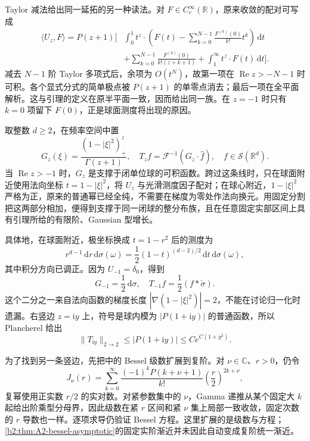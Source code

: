 Taylor 减法给出同一延拓的另一种读法。对 \(F\in C_c^\infty(\mathbb R)\)，原来收敛的配对可写成
\[
 \begin{aligned}
 \langle U_z,F\rangle
 =P(z+1)\biggl[
 &\int_0^1 t^z\cdot
 \left(F(t)-\sum_{k=0}^{N-1}\frac{F^{(k)}(0)}{k!}t^k\right)\,\mathrm dt\\
 &+\sum_{k=0}^{N-1}\frac{F^{(k)}(0)}{k!(z+k+1)}
 +\int_1^\infty t^z\cdot F(t)\,\mathrm dt
 \biggr].
 \end{aligned}
\]
减去 \(N-1\) 阶 Taylor 多项式后，余项为 \(O(t^N)\)，故第一项在 \(\operatorname{Re}z>-N-1\) 时可积。各个显式分式的简单极点被 \(P(z+1)\) 的单零点消去；最后一项在全平面解析。这与引理的定义在原半平面一致，因而给出同一族。在 \(z=-1\) 时只有 \(k=0\) 项留下 \(F(0)\)，正是球面测度将出现的原因。

\ProseParagraphBreak
取整数 \(d\geq2\)，在频率空间中置
\[
 G_z(\xi)=\frac{(1-|\xi|^2)_+^z}{\Gamma(z+1)},
 \quad T_zf=\mathcal F^{-1}(G_z\cdot\widehat f),
 \quad f\in\mathcal S(\mathbb R^d).
\]
当 \(\operatorname{Re}z>-1\) 时，\(G_z\) 是支撑于闭单位球的可积函数。跨过这条线时，只在球面附近使用法向坐标 \(t=1-|\xi|^2\)，将 \(U_z\) 与光滑测度因子配对；在球心附近，\(1-|\xi|^2\) 严格为正，原来的普通幂已经全纯，不需要在梯度为零处作法向换元。用固定分割把这两部分相加，便得到支撑于同一闭球的整分布族，且在任意固定实部区间上具有引理所给的有限阶、Gaussian 型增长。

\ProseParagraphBreak
具体地，在球面附近，极坐标换成 \(t=1-r^2\) 后的测度为
\[
 r^{d-1}\,\mathrm dr\,\mathrm d\sigma(\omega)
 =\frac12(1-t)^{(d-2)/2}\,\mathrm dt\,\mathrm d\sigma(\omega),
\]
其中积分方向已调正。因为 \(U_{-1}=\delta_0\)，得到
\[
 G_{-1}=\frac12\,\mathrm d\sigma,\quad
 T_{-1}f=\frac12(f*\check\sigma).
\]
这个二分之一来自法向函数的梯度长度 \(|\nabla(1-|\xi|^2)|=2\)，不能在讨论归一化时遗漏。右竖边 \(z=\mathrm iy\) 上，符号是球内模为 \(|P(1+\mathrm iy)|\) 的普通函数，所以 Plancherel 给出
\[
 \|T_{\mathrm iy}\|_{2\to2}
 \leq |P(1+\mathrm iy)|
 \leq C e^{C(1+y^2)}.
\]

\ProseParagraphBreak
为了找到另一条竖边，先把中的 Bessel 级数扩展到复阶。对 \(\nu\in\mathbb C\)、\(r>0\)，仍令
\[
 J_\nu(r)=\sum_{k=0}^\infty
 \frac{(-1)^kP(k+\nu+1)}{k!}
 \left(\frac r2\right)^{2k+\nu},
\]
复幂使用正实数 \(r/2\) 的实对数。对紧参数集中的 \(\nu\)，Gamma 递推从某个固定大 \(k\) 起给出阶乘型分母界，因此级数在紧 \(r\) 区间和紧 \(\nu\) 集上局部一致收敛，固定次数的 \(r\) 导数也一样。逐项求导仍验证 Bessel 方程。这里扩展的是级数与方程；\cref{b2:thm:A2-bessel-asymptotic}的固定实阶渐近并未因此自动变成复阶统一渐近。

